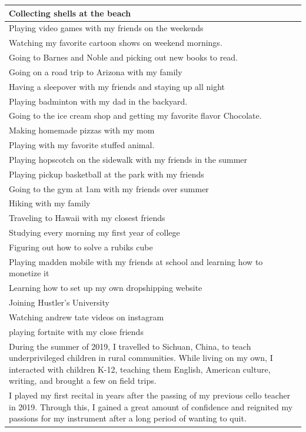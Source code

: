 \documentclass[
  .7em,
  letterpaper,
  DIV=11,
  numbers=noendperiod]{scrartcl}
\begin{document}
\begin{table}
\begin{tabular}{l}
\hline
Collecting shells at the beach\\
\hline
Playing video games with my friends on the weekends\\
\hline
Watching my favorite cartoon shows on weekend mornings.\\
\hline
Going to Barnes and Noble and picking out new books to read.\\
\hline
Going on a road trip to Arizona with my family\\
\hline
Having a sleepover with my friends and staying up all night\\
\hline
Playing badminton with my dad in the backyard.\\
\hline
Going to the ice cream shop and getting my favorite flavor Chocolate.\\
\hline
Making homemade pizzas with my mom\\
\hline
Playing with my favorite stuffed animal.\\
\hline
Playing hopscotch on the sidewalk with my friends in the summer\\
\hline
Playing pickup basketball at the park with my friends\\
\hline
Going to the gym at 1am with my friends over summer\\
\hline
Hiking with my family\\
\hline
Traveling to Hawaii with my closest friends\\
\hline
Studying every morning my first year of college\\
\hline
Figuring out how to solve a rubiks cube\\
\hline
Playing madden mobile with my friends at school and learning how to monetize it\\
\hline
Learning how to set up my own dropshipping website\\
\hline
Joining Hustler's University\\
\hline
Watching andrew tate videos on instagram\\
\hline
playing fortnite with my close friends\\
\hline
During the summer of 2019, I travelled to Sichuan, China, to teach underprivileged children in rural communities. While living on my own, I interacted with children K-12, teaching them English, American culture, writing, and brought a few on field trips.\\
\hline
I played my first recital in years after the passing of my previous cello teacher in 2019. Through this, I gained a great amount of confidence and reignited my passions for my instrument after a long period of wanting to quit.\\

\end{tabular}
\end{table}
\end{document}

